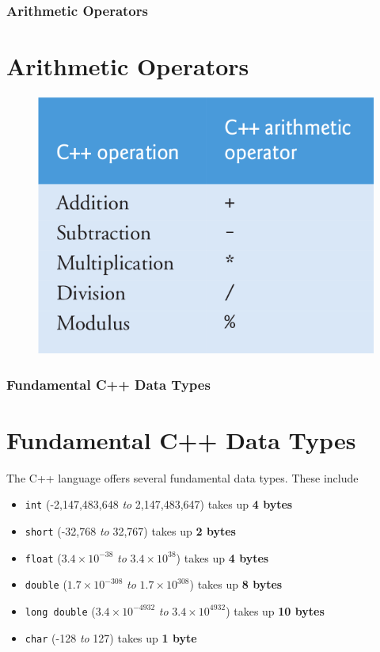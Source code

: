 \documentclass{beamer}
\begin{document}
\begin{frame}
    \frametitle{Arithmetic Operators}
    \section{Arithmetic Operators} %
    \label{sec:arithmetic}
    \begin{figure}
        \centering
        \includegraphics[scale=0.4]{arithematic}
    \end{figure}
\end{frame}

\begin{frame}
    \frametitle{Fundamental C++ Data Types}
    \section{Fundamental C++ Data Types} %
    \label{sec:fundamental_data_types}
    The C++ language offers several fundamental data types. These include
    \begin{itemize}
        \item \texttt{int} (-2,147,483,648 \textit{to} 2,147,483,647) takes up \textbf{4 bytes}
        \item \texttt{short} (-32,768 \textit{to} 32,767) takes up \textbf{2 bytes}
        \item \texttt{float} ($3.4\times10^{-38}$ \textit{to} $3.4\times10^{38}$) takes up \textbf{4 bytes}
        \item \texttt{double} ($1.7\times10^{-308}$ \textit{to} $1.7\times10^{308}$) takes up \textbf{8 bytes}
        \item \texttt{long double} ($3.4\times10^{-4932}$ \textit{to} $3.4\times10^{4932}$) takes up \textbf{10 bytes}
        \item \texttt{char} (-128 \textit{to} 127) takes up \textbf{1 byte}
    \end{itemize}
\end{frame}
\end{document}
